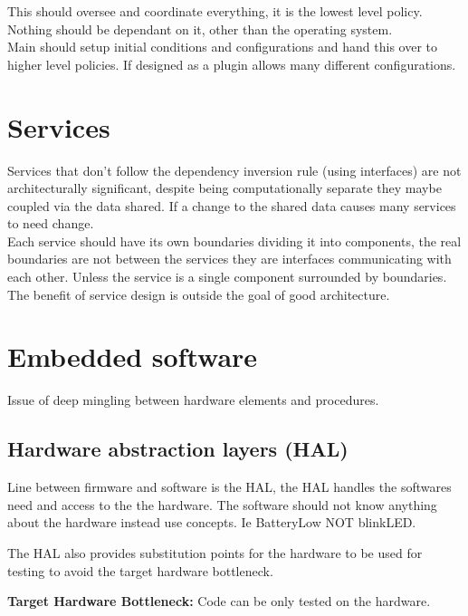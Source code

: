 \documentclass[11pt]{scrartcl} %
\begin{document}
This should oversee and coordinate everything, it is the lowest level policy. Nothing should be
dependant on it, other than the operating system.\\

Main should setup initial conditions and configurations and hand this over to higher level policies.
If designed as a plugin allows many different configurations.

\section{Services}

Services that don't follow the dependency inversion rule (using interfaces) are not architecturally significant,
despite being computationally separate they maybe coupled via the data shared. If a change to the shared data
causes many services to need change.\\

Each service should have its own boundaries dividing it into components, the real boundaries are not between the
services they are interfaces communicating with each other. Unless the service is a single component surrounded by boundaries.\\

The benefit of service design is outside the goal of good architecture.

\section{Embedded software}

Issue of deep mingling between hardware elements and procedures.\\

\subsection{Hardware abstraction layers (HAL)}

Line between firmware and software is the HAL, the HAL handles the softwares need and access to the
the hardware. The software should not know anything about the hardware instead use concepts. Ie
BatteryLow NOT blinkLED.

The HAL also provides substitution points for the hardware to be used for testing to avoid the
target hardware bottleneck.

\textbf{Target Hardware Bottleneck:} Code can be only tested on the hardware.
\end{document}
